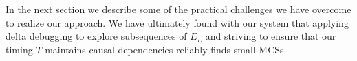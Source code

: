 In the next section we describe some
of the practical challenges we have overcome to realize our approach.
We have ultimately found with our system that applying delta debugging to explore
subsequences of $E_L$ and striving to ensure that our timing $T$ maintains
causal dependencies reliably finds small MCSs.

